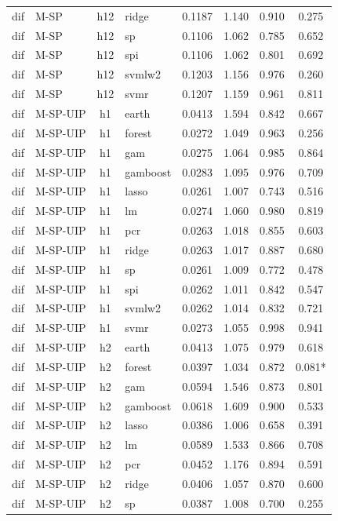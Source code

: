 \begin{ThreePartTable}
\begin{longtable}[t]{llclcccc}
dif & M-SP & h12 & ridge & 0.1187 & 1.140 & 0.910 & 0.275\\
dif & M-SP & h12 & sp & 0.1106 & 1.062 & 0.785 & 0.652\\
dif & M-SP & h12 & spi & 0.1106 & 1.062 & 0.801 & 0.692\\
dif & M-SP & h12 & svmlw2 & 0.1203 & 1.156 & 0.976 & 0.260\\
dif & M-SP & h12 & svmr & 0.1207 & 1.159 & 0.961 & 0.811\\
\addlinespace
dif & M-SP-UIP & h1 & earth & 0.0413 & 1.594 & 0.842 & 0.667\\
dif & M-SP-UIP & h1 & forest & 0.0272 & 1.049 & 0.963 & 0.256\\
dif & M-SP-UIP & h1 & gam & 0.0275 & 1.064 & 0.985 & 0.864\\
dif & M-SP-UIP & h1 & gamboost & 0.0283 & 1.095 & 0.976 & 0.709\\
dif & M-SP-UIP & h1 & lasso & 0.0261 & 1.007 & 0.743 & 0.516\\
dif & M-SP-UIP & h1 & lm & 0.0274 & 1.060 & 0.980 & 0.819\\
dif & M-SP-UIP & h1 & pcr & 0.0263 & 1.018 & 0.855 & 0.603\\
dif & M-SP-UIP & h1 & ridge & 0.0263 & 1.017 & 0.887 & 0.680\\
dif & M-SP-UIP & h1 & sp & 0.0261 & 1.009 & 0.772 & 0.478\\
dif & M-SP-UIP & h1 & spi & 0.0262 & 1.011 & 0.842 & 0.547\\
dif & M-SP-UIP & h1 & svmlw2 & 0.0262 & 1.014 & 0.832 & 0.721\\
dif & M-SP-UIP & h1 & svmr & 0.0273 & 1.055 & 0.998 & 0.941\\
\addlinespace
dif & M-SP-UIP & h2 & earth & 0.0413 & 1.075 & 0.979 & 0.618\\
dif & M-SP-UIP & h2 & forest & 0.0397 & 1.034 & 0.872 & 0.081*\\
dif & M-SP-UIP & h2 & gam & 0.0594 & 1.546 & 0.873 & 0.801\\
dif & M-SP-UIP & h2 & gamboost & 0.0618 & 1.609 & 0.900 & 0.533\\
dif & M-SP-UIP & h2 & lasso & 0.0386 & 1.006 & 0.658 & 0.391\\
dif & M-SP-UIP & h2 & lm & 0.0589 & 1.533 & 0.866 & 0.708\\
dif & M-SP-UIP & h2 & pcr & 0.0452 & 1.176 & 0.894 & 0.591\\
dif & M-SP-UIP & h2 & ridge & 0.0406 & 1.057 & 0.870 & 0.600\\
dif & M-SP-UIP & h2 & sp & 0.0387 & 1.008 & 0.700 & 0.255\\

\end{longtable}
\end{ThreePartTable}
